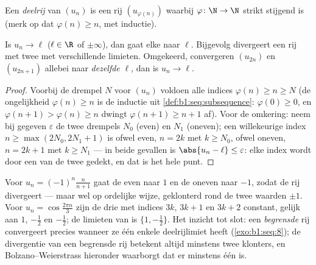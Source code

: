 \begin{definition}[Deelrij]\label{def:b1:seq:subsequence}
Een \emph{deelrij} van $(u_n)$ is een rij
$(u_{\varphi(n)})$ waarbij $\varphi \colon \N \to \N$ strikt stijgend is
(merk op dat $\varphi(n) \geq n$, met inductie).
\end{definition}

\begin{proposition}\label{prop:b1:seq:subsequences}
Is $u_n \to \ell$ ($\ell \in \R$ of $\pm\infty$), dan gaat elke 
naar $\ell$. Bijgevolg divergeert een rij met twee  met
verschillende limieten. Omgekeerd, convergeren $(u_{2n})$ en $(u_{2n+1})$
allebei naar \emph{dezelfde} $\ell$, dan is $u_n \to \ell$.
\end{proposition}

\begin{proof}
Voorbij de drempel $N$ voor $(u_n)$ voldoen alle indices $\varphi(n) \geq
n \geq N$ (de ongelijkheid $\varphi(n) \geq n$ is de inductie uit
\cref{def:b1:seq:subsequence}: $\varphi(0) \geq 0$, en $\varphi(n+1) >
\varphi(n) \geq n$ dwingt $\varphi(n+1) \geq n + 1$ af). Voor de
omkering: neem bij gegeven $\varepsilon$ de twee drempels $N_0$ (even) en
$N_1$ (oneven); een willekeurige index $n \geq \max(2N_0, 2N_1 + 1)$ is
ofwel even, $n = 2k$ met $k \geq N_0$, ofwel oneven, $n = 2k+1$ met $k
\geq N_1$ --- in beide gevallen is $\abs{u_n - \ell} \leq \varepsilon$:
elke index wordt door een van de twee  gedekt, en dat is het hele
punt.
\end{proof}

\begin{example}\label{ex:b1:seq:sublimits}
Voor $u_n = (-1)^n \frac{n}{n+1}$ gaat de even  naar $1$ en de
oneven naar $-1$, zodat de rij divergeert --- maar wel op ordelijke
wijze, geklonterd rond de twee waarden $\pm 1$. Voor $u_n =
\cos\frac{2\pi n}{3}$ zijn de drie  met indices $3k$, $3k + 1$
en $3k + 2$ constant, gelijk aan $1$, $-\frac12$ en $-\frac12$; de
 limieten van  is $\{1, -\frac12\}$. Het inzicht tot
slot: een \emph{begrensde} rij convergeert precies wanneer ze één enkele
deelrijlimiet heeft (\cref{exo:b1:seq:8}); de divergentie van een
begrensde rij betekent altijd minstens twee klonters, en
Bolzano--Weierstrass hieronder waarborgt dat er minstens één is.
\end{example}

